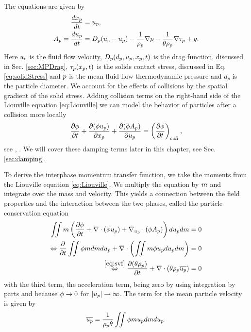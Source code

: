 The equations are given by
\begin{align}
    \dfrac{d x_p}{d t} &= u_p, \\
    \label{eq:accel}
    A_p = \dfrac{d u_p}{d t} &=D_p(u_c - u_p) - \dfrac{1}{\rho_p} \nabla p - \dfrac{1}{\theta \rho_p} \nabla \tau_p + g.
\end{align}
Here $u_c$ is the fluid flow velocity, $D_p(d_p,u_p, x_p,t)$ is the drag function, discussed in Sec. \ref{sec:MPDrag}, $\tau_p(x_p, t)$ is the solids contact stress, discussed in Eq. \ref{eq:solidStress} and $p$ is the mean fluid flow thermodynamic pressure and $d_p$ is the particle diameter.
We account for the effects of collisions by the spatial gradient of the solid stress. 
Adding collision terms on the right-hand side of the Liouville equation \eqref{eq:Liouville} we can model the behavior of particles after a collision more locally
\begin{equation}
    \label{eq:LiouCollide}
    \dfrac{\partial \phi}{\partial t} + \dfrac{\partial (\phi u_p)}{\partial x_p} + \dfrac{\partial (\phi A_p)}{\partial u_p} = \left( \dfrac{\partial \phi}{\partial 
    t} \right)_{coll},
\end{equation}
see \cite{damp}, \cite{isotropy}.
We will cover these damping terms later in this chapter, see Sec. \ref{sec:damping}.

To derive the interphase momentum transfer function, we take the moments from the Liouville equation \eqref{eq:Liouville}.
We multiply the equation by $m$ and integrate over the mass and velocity. This yields a connection between the field properties and the interaction between the two phases, called the particle conservation equation
\begin{equation}
\begin{aligned}
    \MultiIntegral{2} \m \left( \dfrac{\partial \pd}{\partial \tvar} + \nabla \cdot (\pd \up) + \nabla_{\up} \cdot (\pd \Ap)\right) d \up d \m = 0 \\
    \Leftrightarrow
    \dfrac{\partial }{\partial \tvar} \MultiIntegral{2} \pd \m d \m d \up + \nabla \cdot \left( \MultiIntegral{2} m \pd \up d\up d \m \right) = 0\\
    \stackrel{\eqref{eq:svf}}{\Leftrightarrow} \dfrac{\partial (\pvf \rp )}{\partial t} + \nabla \cdot (\pvf \rp \overline{\up}) = 0    
\end{aligned}    
\end{equation}
with the third term, the acceleration term, being zero by using integration by parts and because $\phi \to 0$ for $\lvert u_p \rvert \to \infty$.
The term for the mean particle velocity is given by
\begin{equation}
    \overline{\up} = \dfrac{1}{\rp \pvf}\MultiIntegral{2} \pd \m \up d\m d \up.
\end{equation}

